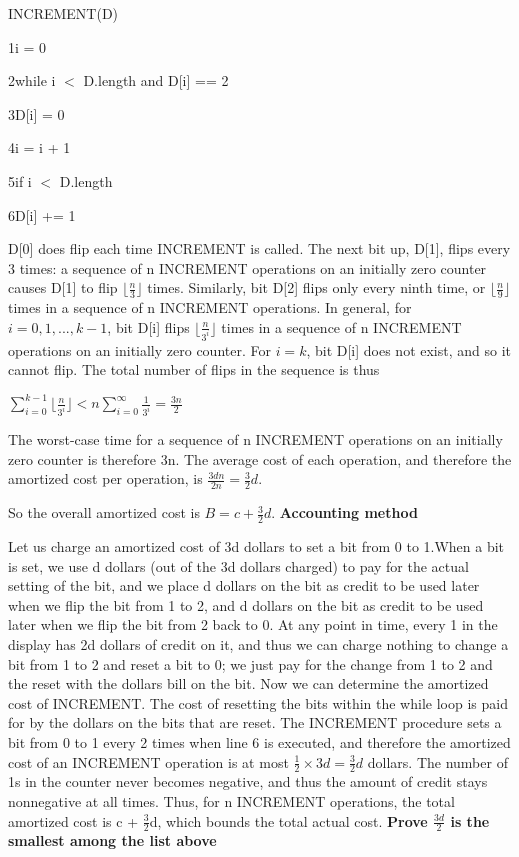 \documentclass[11pt, answers]{exam}
\newcommand\floor[1]{\lfloor#1\rfloor}
\theoremstyle{plain}
\theoremstyle{definition}
\begin{document}
\begin{questions}
\begin{solution}
\begin{enumerate}
INCREMENT(D)

1\qquad i = 0

2\qquad while i $<$ D.length and D[i] == 2

3\qquad\qquad D[i] = 0

4\qquad\qquad i = i + 1

5\qquad if i $<$ D.length

6\qquad\qquad D[i] += 1

D[0] does flip each time INCREMENT is called.
The next bit up, D[1], flips every 3 times: a sequence of n INCREMENT operations on an initially zero counter causes D[1] to flip $\floor{\frac{n}{3}}$ times. Similarly,
bit D[2] flips only every ninth time, or $\floor{\frac{n}{9}}$ times in a sequence of n INCREMENT
operations. In general, for $i = 0, 1, ..., k - 1$, bit D[i] flips $\floor{\frac{n}{3^i}}$ times in a
sequence of n INCREMENT operations on an initially zero counter. For $i = k$,
bit D[i] does not exist, and so it cannot flip. The total number of flips in the
sequence is thus

$\sum_{i=0}^{k-1}\floor{\frac{n}{3^i}} < n\sum_{i=0}^{\infty}{\frac{1}{3^i}} = {\frac{3n}{2}}$

The worst-case time for a sequence of n INCREMENT operations
on an initially zero counter is therefore 3n. The average cost of each operation,
and therefore the amortized cost per operation, is $\frac{3dn}{2n} = {\frac{3}{2}}d$.
\end{enumerate}
\qquad So the overall amortized cost is $B = c + {\frac{3}{2}}d$. \newline
\newline
\textbf{Accounting method}

Let us charge an amortized cost of 3d dollars to set a bit from 0 to 1.When a bit is set, we use d dollars (out of the 3d dollars charged) to pay for the actual setting of the bit, and we place d dollars on the bit as credit to be used later when we flip the bit from 1 to 2, and d dollars on the bit as credit to be used later when we flip the bit from 2 back to 0. At any point in time, every 1 in the display has 2d dollars of credit on it, and thus we can charge nothing to change a bit from 1 to 2 and reset a bit to 0; we just pay for the change from 1 to 2 and the reset with the dollars bill on the bit. Now we can determine the amortized cost of INCREMENT. The cost of resetting the bits within the while loop is paid for by the dollars on the bits that are reset. The INCREMENT procedure sets a bit from 0 to 1 every 2 times when line 6 is executed, and therefore the amortized cost of an INCREMENT operation is at most ${\frac{1}{2}} \times 3d = {\frac{3}{2}}d$ dollars. The number of 1s in the counter never becomes negative, and thus the amount of credit stays nonnegative at all times. Thus, for n INCREMENT operations, the total amortized cost is c + ${\frac{3}{2}}$d, which bounds the total actual cost.
\newline
\newline
\textbf{Prove ${\frac{3d}{2}}$ is the smallest among the list above}


\end{solution}
\end{questions}
\end{document}
